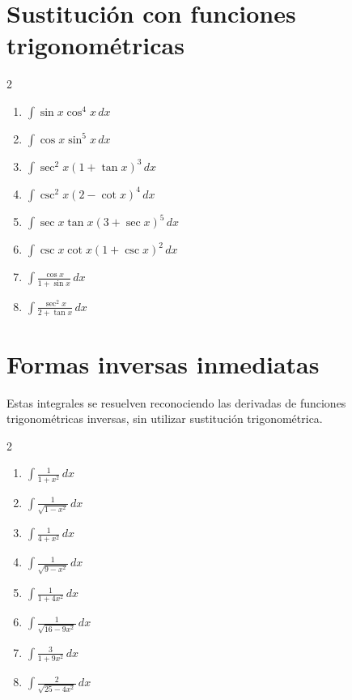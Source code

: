 \documentclass[11pt]{article}
\begin{document}
\section{Sustitución con funciones trigonométricas}
\begin{multicols}{2}\begin{enumerate}
\item $\displaystyle \int\sin x\cos^4x\,dx$
\item $\displaystyle \int\cos x\sin^5x\,dx$
\item $\displaystyle \int\sec^2x(1+\tan x)^3\,dx$
\item $\displaystyle \int\csc^2x(2-\cot x)^4\,dx$
\item $\displaystyle \int\sec x\tan x(3+\sec x)^5\,dx$
\item $\displaystyle \int\csc x\cot x(1+\csc x)^2\,dx$
\item $\displaystyle \int\frac{\cos x}{1+\sin x}\,dx$
\item $\displaystyle \int\frac{\sec^2x}{2+\tan x}\,dx$
\end{enumerate}\end{multicols}

\section{Formas inversas inmediatas}
Estas integrales se resuelven reconociendo las derivadas de funciones trigonométricas inversas, sin utilizar sustitución trigonométrica.
\begin{multicols}{2}\begin{enumerate}
\item $\displaystyle \int\frac{1}{1+x^2}\,dx$
\item $\displaystyle \int\frac{1}{\sqrt{1-x^2}}\,dx$
\item $\displaystyle \int\frac{1}{4+x^2}\,dx$
\item $\displaystyle \int\frac{1}{\sqrt{9-x^2}}\,dx$
\item $\displaystyle \int\frac{1}{1+4x^2}\,dx$
\item $\displaystyle \int\frac{1}{\sqrt{16-9x^2}}\,dx$
\item $\displaystyle \int\frac{3}{1+9x^2}\,dx$
\item $\displaystyle \int\frac{2}{\sqrt{25-4x^2}}\,dx$
\end{enumerate}\end{multicols}
\end{document}
